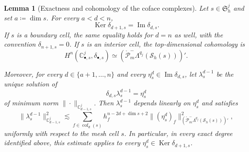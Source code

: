 \documentclass[a4paper,11pt]{article}
\newtheorem{lemma}[theorem]{Lemma}
\theoremstyle{definition}
\newcommand{\Sh}{\mathcal{S}_h}
\newcommand{\cof}[1]{\operatorname{cof}_{#1}}
\newcommand{\Ker}{\operatorname{Ker}}
\newcommand{\PLtrimz}[2]{\mathring{\mathcal P}_{#1}^{-}\Lambda^{#2}}
\begin{document}
\begin{lemma}[Exactness and cohomology of the coface complexes]
\label{lem:coface.exactness}
Let $s\in\mathfrak S_h^j$ and set $a\coloneqq\dim s$.
For every $a<d<n$,
\begin{equation}\label{eq:coface.exactness}
  \Ker\delta_{d+1,s}
  =
  \operatorname{Im}\delta_{d,s}.
\end{equation}
If $s$ is a boundary cell, the same equality holds for $d=n$ as well, with the convention $\delta_{n+1,s}=0$.
If $s$ is an interior cell, the top-dimensional cohomology is
\begin{equation}\label{eq:coface.top.cohomology}
  H^n
  \left(
    \mathbb C_{\bullet,s}^j,
    \delta_{\bullet,s}
  \right)
  \simeq
  \left(\PLtrimz{m}{q_j}(\Sh(s))\right)'.
\end{equation}

Moreover, for every $d\in\{a+1,\ldots,n\}$ and every $\eta_s^d\in\operatorname{Im}\delta_{d,s}$, let $\lambda_s^{d-1}$ be the unique solution of
\[
  \delta_{d,s}\lambda_s^{d-1}
  =
  \eta_s^d
\]
of minimum norm $\|\cdot\|_{\mathbb C_{d-1,s}^j}$.
Then $\lambda_s^{d-1}$ depends linearly on $\eta_s^d$ and satisfies
\begin{equation}\label{eq:coface.poincare}
  \|\lambda_s^{d-1}\|_{\mathbb C_{d-1,s}^j}^2
  \lesssim
  \sum_{f\in\cof{d}(s)}
  h_f^{n-2d+\dim s+2}
  \|(\eta_s^d)_f\|_{(\PLtrimz{m}{q_j}(\Sh(s)))'}^2,
\end{equation}
uniformly with respect to the mesh cell $s$.
In particular, in every exact degree identified above, this estimate applies to every $\eta_s^d\in\Ker\delta_{d+1,s}$.
\end{lemma}
\end{document}
